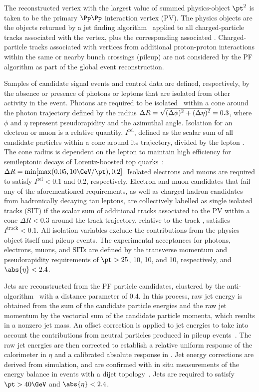 The reconstructed vertex with the largest value of summed
physics-object $\pt^2$ is taken to be the primary $\Pp\Pp$ interaction
vertex (PV). The physics objects are the objects returned by a jet
finding algorithm~\cite{Cacciari:2008gp, Cacciari:2011ma} applied to
all charged-particle tracks associated with the vertex, plus the
corresponding associated \ptmiss. Charged-particle tracks associated
with vertices from additional proton-proton interactions within the
same or nearby bunch crossings (pileup) are not considered by the PF
algorithm as part of the global event reconstruction.

Samples of candidate signal events and control data are defined,
respectively, by the absence or presence of photons or leptons that
are isolated from other activity in the event. Photons are required to
be isolated~\cite{Khachatryan:2015iwa} within a cone around the photon
trajectory defined by the radius ${\Delta}R =
\sqrt{\smash[b]{(\Delta\phi)^2 + (\Delta\eta)^2}} = 0.3$, where $\phi$
and $\eta$ represent pseudorapidity and the azimuthal angle. Isolation
for an electron or muon is a relative quantity, $I^\text{rel}$,
defined as the scalar \pt sum of all candidate particles within a cone
around its trajectory, divided by the lepton \pt. The cone radius is
dependent on the lepton \pt to maintain high efficiency for
semileptonic decays of Lorentz-boosted top
quarks~\cite{Rehermann:2010vq}: ${\Delta}R = \min [ \max( 0.05, 10\GeV
/ \pt ), 0.2 ]$. Isolated electrons and muons are required to satisfy
$I^\text{rel} < 0.1$ and 0.2, respectively.  Electron and muon
candidates that fail any of the aforementioned requirements, as well
as charged-hadron candidates from hadronically decaying tau leptons,
are collectively labelled as single isolated tracks (SIT) if the
scalar \pt sum of additional tracks associated to the PV within a cone
${\Delta}R < 0.3$ around the track trajectory, relative to the track
\pt, satisfies $I^\text{track} < 0.1$. All isolation variables exclude
the contributions from the physics object itself and pileup
events. The experimental acceptances for photons, electrons, muons,
and SITs are defined by the transverse momentum and pseudorapidity
requirements of $\pt > 25$, 10, 10, and 10\GeV, respectively, and
$\abs{\eta} < 2.4$.

Jets are reconstructed from the PF particle candidates, clustered by
the anti-\kt algorithm~\cite{Cacciari:2008gp, Cacciari:2011ma} with a
distance parameter of 0.4. In this process, raw jet energy is obtained
from the sum of the candidate particle energies and the raw jet
momentum by the vectorial sum of the candidate particle momenta, which
results in a nonzero jet mass. An offset correction is applied to jet
energies to take into account the contributions from neutral particles
produced in pileup events~\cite{Cacciari:2007fd,
  CMS-PAS-JME-14-001}. The raw jet energies are then corrected to
establish a relative uniform response of the calorimeter in $\eta$ and
a calibrated absolute response in \pt. Jet energy corrections are
derived from simulation, and are confirmed with in situ measurements
of the energy balance in events with a dijet
topology~\cite{Khachatryan:2016kdb}. Jets are required to satisfy $\pt
> 40\GeV$ and $\abs{\eta} < 2.4$.

